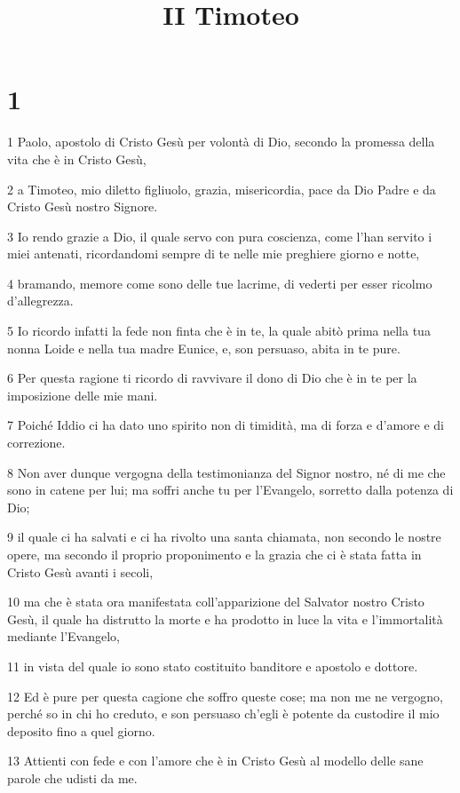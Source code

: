 

\title{II Timoteo}


\chapter{1}

\par 1 Paolo, apostolo di Cristo Gesù per volontà di Dio, secondo la promessa della vita che è in Cristo Gesù,
\par 2 a Timoteo, mio diletto figliuolo, grazia, misericordia, pace da Dio Padre e da Cristo Gesù nostro Signore.
\par 3 Io rendo grazie a Dio, il quale servo con pura coscienza, come l'han servito i miei antenati, ricordandomi sempre di te nelle mie preghiere giorno e notte,
\par 4 bramando, memore come sono delle tue lacrime, di vederti per esser ricolmo d'allegrezza.
\par 5 Io ricordo infatti la fede non finta che è in te, la quale abitò prima nella tua nonna Loide e nella tua madre Eunice, e, son persuaso, abita in te pure.
\par 6 Per questa ragione ti ricordo di ravvivare il dono di Dio che è in te per la imposizione delle mie mani.
\par 7 Poiché Iddio ci ha dato uno spirito non di timidità, ma di forza e d'amore e di correzione.
\par 8 Non aver dunque vergogna della testimonianza del Signor nostro, né di me che sono in catene per lui; ma soffri anche tu per l'Evangelo, sorretto dalla potenza di Dio;
\par 9 il quale ci ha salvati e ci ha rivolto una santa chiamata, non secondo le nostre opere, ma secondo il proprio proponimento e la grazia che ci è stata fatta in Cristo Gesù avanti i secoli,
\par 10 ma che è stata ora manifestata coll'apparizione del Salvator nostro Cristo Gesù, il quale ha distrutto la morte e ha prodotto in luce la vita e l'immortalità mediante l'Evangelo,
\par 11 in vista del quale io sono stato costituito banditore e apostolo e dottore.
\par 12 Ed è pure per questa cagione che soffro queste cose; ma non me ne vergogno, perché so in chi ho creduto, e son persuaso ch'egli è potente da custodire il mio deposito fino a quel giorno.
\par 13 Attienti con fede e con l'amore che è in Cristo Gesù al modello delle sane parole che udisti da me.

